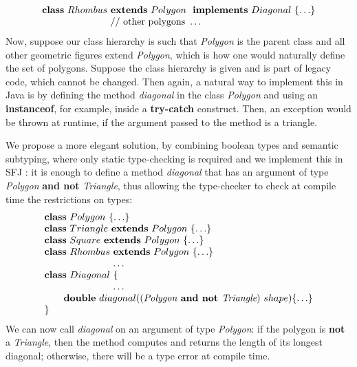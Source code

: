 \documentclass[runningheads]{llncs}
\begin{document}
\begin{example}[Polygons]
\begin{equation*}
\begin{array}{l}
            \mathbf{class} \  Rhombus \ \mathbf{extends }\  Polygon\  \ \mathbf{implements}\  Diagonal \ \{\ldots\}
            \\
            \hspace{2.5cm} // \text{ other polygons } \ldots
        \end{array}
    \end{equation*}
    Now, suppose our class hierarchy is such that \emph{Polygon} is the parent class and all other geometric figures extend \emph{Polygon}, which is how one would naturally define the set of polygons.
    Suppose the class hierarchy is given and is part of legacy code, which cannot be changed.
    Then again, a natural way to implement this in Java is by defining the method \emph{diagonal} in the class \emph{Polygon} and using an \textbf{instanceof}, for example, inside a \textbf{try-catch} construct.
    Then, an exception would be thrown at runtime, if the argument passed to the method is a triangle.

    We propose a more elegant solution, by combining boolean types and semantic subtyping, where only static type-checking is required and we implement this in SFJ \cite{UD20}: it is enough to define a method \emph{diagonal} that has an argument of type \emph{Polygon} \textbf{and not} \emph{Triangle}, thus allowing the type-checker to check at compile time the restrictions on types:
    \begin{equation*}
        \begin{array}{l}
            \mathbf{class} \  Polygon \ \{\ldots\}
            \\
            \mathbf{class} \  Triangle \ \mathbf{extends }\  Polygon\ \{\ldots\}
            \\
            \mathbf{class} \  Square \ \mathbf{extends }\  Polygon\ \{\ldots\}
            \\
            \mathbf{class} \  Rhombus \ \mathbf{extends }\  Polygon\ \{\ldots\}
            \\
            \hspace{2.5cm} \ldots
            \\
            \mathbf{class} \  Diagonal \ \{
            \\
            \hspace{2.5cm} \ldots \\
            \qquad \mathbf{double}\ diagonal((\textit{Polygon} \textbf{ and not }  \textit{Triangle}) \ shape)\{\ldots\}
            \\
            \}
        \end{array}
    \end{equation*}
    We can now call \emph{diagonal} on an argument of type \emph{Polygon}: if the polygon is \textbf{not} a \emph{Triangle}, then the method computes and returns the length of its longest diagonal; otherwise, there will be a type error at compile time.
\end{example}
\end{document}
